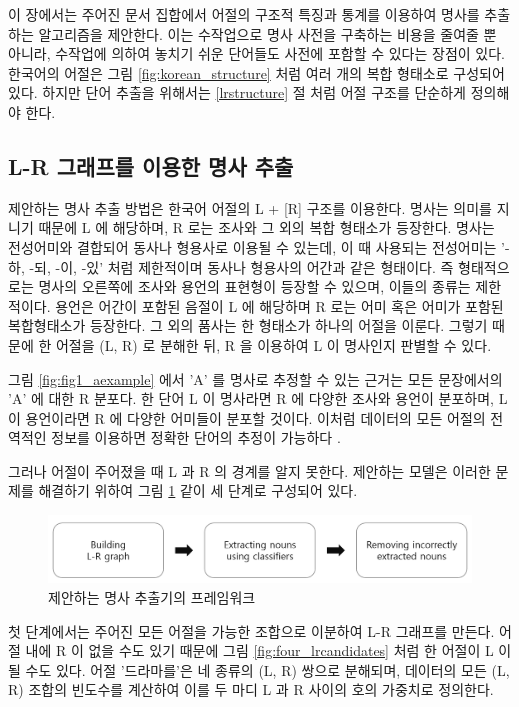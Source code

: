 \documentclass[oneside, ko,phd]{snuthesis_utf8_kor}
\begin{document}
이 장에서는 주어진 문서 집합에서 어절의 구조적 특징과 통계를 이용하여 명사를 추출하는 알고리즘을 제안한다.
이는 수작업으로 명사 사전을 구축하는 비용을 줄여줄 뿐 아니라, 수작업에 의하여 놓치기 쉬운 단어들도 사전에 포함할 수 있다는 장점이 있다.
한국어의 어절은 그림 \ref{fig:korean_structure} 처럼 여러 개의 복합 형태소로 구성되어 있다.
하지만 단어 추출을 위해서는 \ref{lrstructure} 절 처럼 어절 구조를 단순하게 정의해야 한다.

\subsection{L-R 그래프를 이용한 명사 추출}

제안하는 명사 추출 방법은 한국어 어절의 L + [R] 구조를 이용한다.
명사는 의미를 지니기 때문에 L 에 해당하며, R 로는 조사와 그 외의 복합 형태소가 등장한다.
명사는 전성어미와 결합되어 동사나 형용사로 이용될 수 있는데, 이 때 사용되는 전성어미는 '-하, -되, -이, -있' 처럼 제한적이며 동사나 형용사의 어간과 같은 형태이다.
즉 형태적으로는 명사의 오른쪽에 조사와 용언의 표현형이 등장할 수 있으며, 이들의 종류는 제한적이다.
용언은 어간이 포함된 음절이 L 에 해당하며 R 로는 어미 혹은 어미가 포함된 복합형태소가 등장한다.
그 외의 품사는 한 형태소가 하나의 어절을 이룬다.
그렇기 때문에 한 어절을 (L, R) 로 분해한 뒤, R 을 이용하여 L 이 명사인지 판별할 수 있다.

그림 \ref{fig:fig1_aexample} 에서 'A' 를 명사로 추정할 수 있는 근거는 모든 문장에서의 'A' 에 대한 R 분포다.
한 단어 L 이 명사라면 R 에 다양한 조사와 용언이 분포하며, L 이 용언이라면 R 에 다양한 어미들이 분포할 것이다.
이처럼 데이터의 모든 어절의 전역적인 정보를 이용하면 정확한 단어의 추정이 가능하다 \cite{zhao2007incorporating}.

그러나 어절이 주어졌을 때 L 과 R 의 경계를 알지 못한다.
제안하는 모델은 이러한 문제를 해결하기 위하여 그림 \ref{fig:noun_diagram} 같이 세 단계로 구성되어 있다.

\begin{figure}[ht]
\centering
\includegraphics[keepaspectratio=true, width=0.5\linewidth]{fig/noun_diagram.png}
\caption{제안하는 명사 추출기의 프레임워크}
\label{fig:noun_diagram}
\end{figure}

첫 단계에서는 주어진 모든 어절을 가능한 조합으로 이분하여 L-R 그래프를 만든다.
어절 내에 R 이 없을 수도 있기 때문에 그림 \ref{fig:four_lrcandidates} 처럼 한 어절이 L 이 될 수도 있다.
어절 '드라마를'은 네 종류의 (L, R) 쌍으로 분해되며, 데이터의 모든 (L, R) 조합의 빈도수를 계산하여 이를 두 마디 L 과 R 사이의 호의 가중치로 정의한다.
\end{document}
